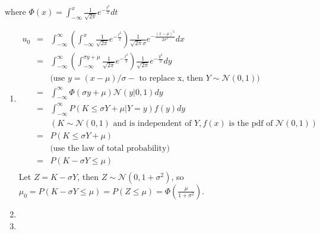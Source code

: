 \documentclass[10pt,a4paper]{article}
\def\MN{{\mathcal N}}
\begin{document}
\begin{enumerate}
\begin{enumerate}
where $\Phi(x) = \int_{-\infty}^{x} \frac{1}{\sqrt{2\pi}} e^{-\frac{t^2}{2}} dt$
\end{enumerate}
\begin{enumerate}
\item 
\begin{eqnarray*}
u_0 &=& \int_{-\infty}^{\infty} \left(\int_{-\infty}^{x} \frac{1}{\sqrt{2\pi}} e^{-\frac{t^2}{2}}\right) \frac{1}{\sqrt{2\pi}\sigma} e^{-\frac{(x-\mu)^2}{2\sigma^2}} dx \\
&=& \int_{-\infty}^{\infty} \left(\int_{-\infty}^{\sigma y+\mu} \frac{1}{\sqrt{2\pi}} e^{-\frac{t^2}{2}}\right) \frac{1}{\sqrt{2\pi}} e^{-\frac{y^2}{2}} dy   \\
&& \mbox{(use }y=(x-\mu)/\sigma-\mbox{ to replace x, then }Y\sim \MN(0,1))\\
&=&\int_{-\infty}^{\infty} \Phi(\sigma y+\mu) \MN(y|0, 1) dy \\
&=&\int_{-\infty}^{\infty} P(K\le \sigma Y+\mu | Y=y) f(y) dy  \\
&&(K \sim \MN(0,1) \mbox{ and is independent of }Y, f(x)\mbox{ is the pdf of }\MN(0,1)) \\
&=&P(K\le \sigma Y+\mu) \\
&&\mbox{(use the law of total probability)}\\
&=&P(K-\sigma Y\le \mu) \\
\end{eqnarray*}
Let $Z=K-\sigma Y$, then $Z\sim \MN(0,1+\sigma^2)$, so $\mu_0=P(K-\sigma Y\le \mu) = P(Z\le \mu) = \Phi(\frac{\mu}{1+\sigma^2})$.
\item 
\item 
\end{enumerate}
\end{enumerate}
\end{document}
